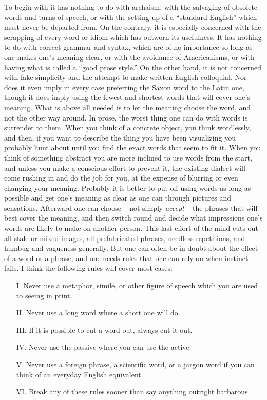 \documentclass[article,twoside,a4paper]{memoir}
\begin{document}
To begin with it has nothing to do with archaism, with the salvaging of obsolete
words and turns of speech, or with the setting up of a ``standard English''
which must never be departed from. On the contrary, it is especially concerned
with the scrapping of every word or idiom which has outworn its usefulness.
It has nothing to do with correct grammar and syntax, which are of no importance
so long as one makes one's meaning clear, or with the avoidance of Americanisms,
or with having what is called a ``good prose style.'' On the other hand,
it is not concerned with fake simplicity and the attempt to make written English
colloquial. Nor does it even imply in every case preferring the Saxon word to
the Latin one, though it does imply using the fewest and shortest words that
will cover one's meaning. What is above all needed is to let the meaning choose
the word, and not the other way around. In prose, the worst thing one can do
with words is surrender to them. When you think of a concrete object, you think
wordlessly, and then, if you want to describe the thing you have been visualizing
you probably hunt about until you find the exact words that seem to fit it.
When you think of something abstract you are more inclined to use words from
the start, and unless you make a conscious effort to prevent it, the existing
dialect will come rushing in and do the job for you, at the expense of blurring
or even changing your meaning. Probably it is better to put off using words
as long as possible and get one's meaning as clear as one can through pictures
and sensations. Afterward one can choose -- not simply \emph{accept} -- the
phrases that will best cover the meaning, and then switch round and decide what
impressions one's words are likely to make on another person. This last effort
of the mind cuts out all stale or mixed images, all prefabricated phrases, needless
repetitions, and humbug and vagueness generally. But one can often be in doubt
about the effect of a word or a phrase, and one needs rules that one can rely
on when instinct fails. I think the following rules will cover most cases:

\begin{itemize}
  \item[I.]
    Never use a metaphor, simile, or other figure of speech which you are used
    to seeing in print.
  \item[II.]
    Never use a long word where a short one will do.
  \item[III.]
    If it is possible to cut a word out, always cut it out.
  \item[IV.]
    Never use the passive where you can use the active.
  \item[V.]
    Never use a foreign phrase, a scientific word, or a jargon word if you
    can think of an everyday English equivalent.
  \item[VI.]
    Break any of these rules sooner than say anything outright barbarous.
\end{itemize}
\end{document}

